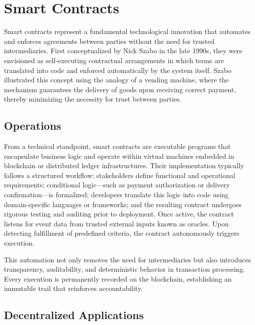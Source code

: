 \documentclass[final]{rc-book-2.14}
\begin{document}
\section{Smart Contracts}
\label{chp:background:sec:smart_cont}

Smart contracts represent a fundamental technological innovation that automates and enforces agreements between parties without the need for trusted intermediaries. First conceptualized by Nick Szabo in the late 1990s, they were envisioned as self-executing contractual arrangements in which terms are translated into code and enforced automatically by the system itself\cite{szabo1996smart}. Szabo illustrated this concept using the analogy of a vending machine, where the mechanism guarantees the delivery of goods upon receiving correct payment, thereby minimizing the necessity for trust between parties\cite{szabo1997formalizing}.

\subsection{Operations}

From a technical standpoint, smart contracts are executable programs that encapsulate business logic and operate within virtual machines embedded in blockchain or distributed ledger infrastructures. Their implementation typically follows a structured workflow: stakeholders define functional and operational requirements; conditional logic—such as payment authorization or delivery confirmation—is formalized; developers translate this logic into code using domain-specific languages or frameworks; and the resulting contract undergoes rigorous testing and auditing prior to deployment. Once active, the contract listens for event data from trusted external inputs known as oracles. Upon detecting fulfillment of predefined criteria, the contract autonomously triggers execution\cite{simplilearn2022smart}.

This automation not only removes the need for intermediaries but also introduces transparency, auditability, and deterministic behavior in transaction processing. Every execution is permanently recorded on the blockchain, establishing an immutable trail that reinforces accountability.

\subsection{Decentralized Applications}
\end{document}
